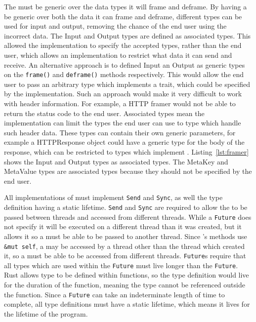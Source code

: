 The \framer{} must be generic over the data types it will frame and deframe.
By having a \framer{} be generic over both the data it can frame and deframe, different types can be used for input
and output, removing the chance of the end user using the incorrect data.
The Input and Output types are defined as associated types.
This allowed the implementation to specify the accepted types, rather than the end user, which allows an implementation to
restrict what data it can send and receive.
An alternative approach is to defined Input an Output as generic types on the \texttt{frame()} and \texttt{deframe()}
methods respectively.
This would allow the end user to pass an arbitrary type which implements a trait, which could be specified by the
implementation.
Such an approach would make it very difficult to work with header information.
For example, a HTTP framer would not be able to return the status code to the end user.
Associated types mean the implementation can limit the types the end user can use to type which handle such header data.
These types can contain their own generic parameters, for example a HTTPResponse object could have a generic type for
the body of the response, which can be restricted to types which implement \decode{}.
Listing~\ref{lst:framer} shows the Input and Output types as associated types.
The MetaKey and MetaValue types are associated types because they should not be specified by the end user.

All implementations of \framer{} must implement \texttt{Send} and \texttt{Sync}, as well the type definition having
a static lifetime.
\texttt{Send} and \texttt{Sync} are required to allow the \framer{} to be passed between threads and accessed from
different threads.
While a \texttt{Future} does not specify it will be executed on a different thread than it was created, but it allows
it so a \framer{} must be able to be passed to another thread.
Since \framer{}'s methods use \texttt{\&mut self}, a \framer{} may be accessed by a thread other than the thread
which created it, so a \framer{} must be able to be accessed from different threads.
\texttt{Future}s require that all types which are used within the \texttt{Future} must live longer than the
\texttt{Future}.
Rust allows type to be defined within functions, so the type definition would live for the duration of the function,
meaning the type cannot be referenced outside the function.
Since a \texttt{Future} can take an indeterminate length of time to complete, all \framer{} type definitions must
have a static lifetime, which means it lives for the lifetime of the program.

